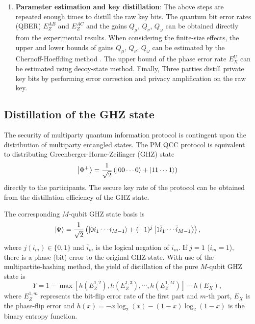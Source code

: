 \documentclass[aps,twocolumn,superscriptaddress,showpacs,nofootinbib]{revtex4-2}
\begin{document}
\begin{enumerate}
	\item[Step.5] \textbf{Parameter estimation and key distillation}: The above steps are repeated enough times to distill the raw key bits. The quantum bit error rates (QBER) $E^{AB}_Z$ and $E^{AC}_Z$ and the gains $Q_{\mu}$, $Q_{\nu}$, $Q_{\omega}$ can be obtained directly from the experimental results. When considering the finite-size effects, the upper and lower bounds of gains $Q_{\mu}$, $Q_{\nu}$, $Q_{\omega}$ can be estimated by the Chernoff-Hoeffding method \cite{PRAZhang2017}. The upper bound of the phase error rate $E^U_X$  can be estimated using decoy-state method. Finally, Three parties distill private key bits by performing error correction and privacy amplification on the raw key.
\end{enumerate}

\subsection{Distillation of the GHZ state} \label{sec:GHZ}

The security of multiparty quantum information protocol is contingent upon the distribution of multiparty entangled states. The PM QCC protocol is equivalent to distributing Greenberger-Horne-Zeilinger (GHZ) state
\begin{equation}
\ket{\Phi^+} = \frac{1}{\sqrt{2}} \left( \ket{00\cdots 0} + \ket{11\cdots 1} \right)
\end{equation}
directly to the participants. The secure key rate of the protocol can be obtained from the distillation efficiency of the GHZ state.

The corresponding $M$-qubit GHZ state basis is
\begin{equation}
\ket{\Psi} = \frac{1}{\sqrt{2}} \left( \ket{0 i_1 \cdots i_{M-1}} + (-1)^j \ket{1 \bar{i}_1\cdots \bar{i}_{M-1}} \right),
\end{equation}
where $j (i_m) \in \{0,1\}$ and $\bar{i}_m$ is the logical negation of $i_m$. If $j=1$ ($i_m = 1$), there is a phase (bit) error to the original GHZ state. With use of the multipartite-hashing method, the yield of distillation of the pure $M$-qubit GHZ state is
\begin{equation}
Y = 1 - \max[h(E^{1,2}_Z),h(E^{1,3}_Z),\cdots,h(E^{1,M}_Z)] - h(E_X),
\end{equation}
where $E^{1,m}_Z$ represents the bit-flip error rate of the first part and $m$-th part, $E_X$ is the phase-flip error and $h(x) = -x \log_2(x) - (1-x) \log_2(1-x)$ is the binary entropy function.
\end{document}
